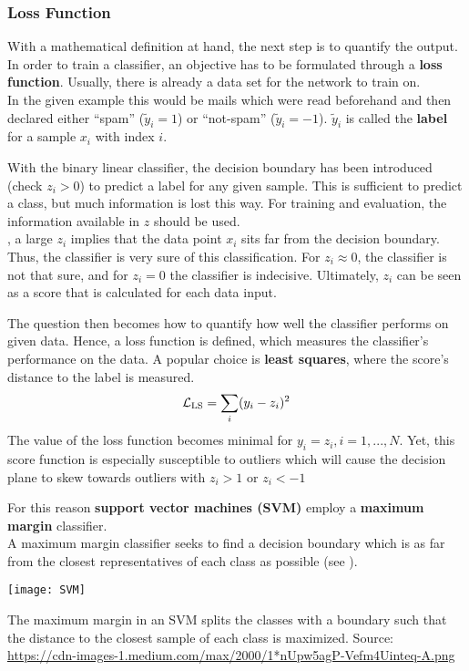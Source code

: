 \subsubsection{Loss Function}
With a mathematical definition at hand, the next step is to quantify the output.
In order to train a classifier, an objective has to be formulated through a \textbf{loss function}.
Usually, there is already a data set for the network to train on.\\
In the given example this would be mails which were read beforehand and then declared either ``spam'' ($\tilde{y}_i = 1$) or ``not-spam'' ($\tilde{y}_i = -1$).
$\tilde{y}_i$ is called the \textbf{label} for a sample $x_i$ with index $i$.

With the binary linear classifier, the decision boundary has been introduced (check $z_i > 0$) to predict a label for any given sample.
This is sufficient to predict a class, but much information is lost this way.
For training and evaluation, the information available in $z$ should be used.\\
\eg, a large $z_i$ implies that the data point $x_i$ sits far from the decision boundary.
Thus, the classifier is very sure of this classification.
For $z_i \approx 0$, the classifier is not that sure, and for $z_i = 0$ the classifier is indecisive.
Ultimately, $z_i$ can be seen as a score that is calculated for each data input.

The question then becomes how to quantify how well the classifier performs on given data.
Hence, a loss function is defined, which measures the classifier's performance on the data.
A popular choice is \textbf{least squares}, where the score's distance to the label is measured.
\begin{align}
    \mathcal{L}_{\text{LS}} = \sum_i (y_i - z_i)^2
\end{align}
The value of the loss function becomes minimal for $y_i = z_i, i = 1,...,N$.
Yet, this score function is especially susceptible to outliers which will cause the decision plane to skew towards outliers with $z_i > 1$ or $z_i < -1$

For this reason \textbf{support vector machines (SVM)} employ a \textbf{maximum margin} classifier.\\
A maximum margin classifier seeks to find a decision boundary which is as far from the closest representatives of each class as possible (see ).
\begin{marginfigure}
    \texttt{[image: SVM]}
    \caption{The maximum margin in an SVM splits the classes with a boundary such that the distance to the closest sample of each class is maximized. Source: \url{https://cdn-images-1.medium.com/max/2000/1*nUpw5agP-Vefm4Uinteq-A.png}}
\end{marginfigure}

